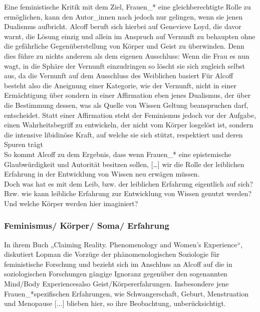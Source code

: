 \noindent Eine feministische Kritik mit
dem Ziel, Frauen\_* eine gleichberechtigte Rolle zu ermöglichen, kann den
Autor\_innen nach jedoch nur gelingen, wenn sie jenen Dualismus aufbricht.
Alcoff beruft sich hierbei auf Genevieve Loyd, die davor warnt, die Lösung
einzig und allein im Anspruch auf Vernunft zu behaupten ohne die gefährliche
Gegenüberstellung von Körper und Geist zu überwinden. Denn dies führe zu nichts
anderem als dem eigenen Ausschluss: \glqq Wenn die Frau es nun wagt, in die Sphäre
der Vernunft einzudringen so löscht sie sich zugleich selbst aus, da die
Vernunft auf dem Ausschluss des Weiblichen basiert\grqq \footnotemark
{} Für Alcoff besteht also
die Aneignung einer Kategorie, wie der Vernunft, nicht in einer Ermächtigung
über sondern in einer Affirmation eben jenes Dualismus, der über die Bestimmung
dessen, was als Quelle von Wissen Geltung beanspruchen darf, entscheidet. Statt
einer Affirmation steht der Feminismus jedoch vor der Aufgabe, einen
Wahrheitsbegriff zu entwickeln, der nicht vom Körper losgelöst ist, sondern
\glqq
die intensive libidinöse Kraft, auf welche sie sich stützt, respektiert und
deren Spuren trägt\grqq\footnotemark {}\\
So kommt Alcoff zu dem Ergebnis, dass \glqq wenn Frauen\_* eine
epistemische Glaubwürdigkeit und Autorität besitzen sollen, […] wir die Rolle
der leiblichen Erfahrung in der Entwicklung von Wissen neu erwägen\grqq
\footnotemark {} müssen.\\
\noindent Doch was hat es mit dem Leib, bzw. der leiblichen Erfahrung eigentlich auf
sich? Bzw. wie kann leibliche Erfahrung zur Entwicklung von Wissen genutzt
werden? Und welche Körper werden hier imaginiert?

\subsubsection{Feminismus/ Körper/ Soma/ Erfahrung}

In ihrem Buch „Claiming Reality. Phenomenology and Women's Experience“,
diskutiert Lopman die Vorzüge der phänomenologischen Soziologie für
feministische Forschung und bezieht sich im Anschluss an Alcoff auf die in
soziologischen Forschungen gängige Ignoranz gegenüber den sogenannten
\glqq Mind/Body Experiences\grqq also Geist/Körpererfahrungen. Insbesondere jene
Frauen\_*spezifischen Erfahrungen, wie \glqq Schwangerschaft, Geburt, Menstruation
und Menopause [...]\grqq \footnotemark {} blieben hier, so ihre Beobachtung, unberücksichtigt.\\

